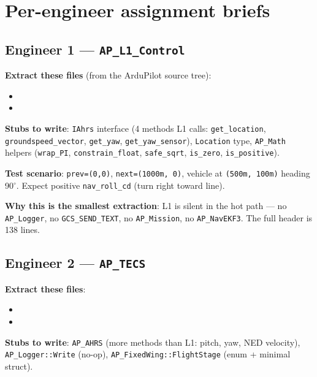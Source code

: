 \documentclass[a4paper,11pt,twoside]{article}
\begin{document}
\section*{Per-engineer assignment briefs}

\subsection*{Engineer 1 --- \texttt{AP\_L1\_Control}}

\textbf{Extract these files} (from the ArduPilot source tree):
\begin{itemize}
  \item {}
  \item {}
\end{itemize}

\textbf{Stubs to write}: \texttt{IAhrs} interface (4 methods L1 calls: \texttt{get\_location}, \texttt{groundspeed\_vector}, \texttt{get\_yaw}, \texttt{get\_yaw\_sensor}), \texttt{Location} type, \texttt{AP\_Math} helpers (\texttt{wrap\_PI}, \texttt{constrain\_float}, \texttt{safe\_sqrt}, \texttt{is\_zero}, \texttt{is\_positive}).

\textbf{Test scenario}: \texttt{prev=(0,0)}, \texttt{next=(1000m, 0)}, vehicle at \texttt{(500m, 100m)} heading 90$^\circ$. Expect positive \texttt{nav\_roll\_cd} (turn right toward line).

\textbf{Why this is the smallest extraction}: L1 is silent in the hot path --- no \texttt{AP\_Logger}, no \texttt{GCS\_SEND\_TEXT}, no \texttt{AP\_Mission}, no \texttt{AP\_NavEKF3}. The full header is 138 lines.

\subsection*{Engineer 2 --- \texttt{AP\_TECS}}

\textbf{Extract these files}:
\begin{itemize}
  \item {}
  \item {}
\end{itemize}

\textbf{Stubs to write}: \texttt{AP\_AHRS} (more methods than L1: pitch, yaw, NED velocity), \texttt{AP\_Logger::Write} (no-op), \texttt{AP\_FixedWing::FlightStage} (enum + minimal struct).
\end{document}
